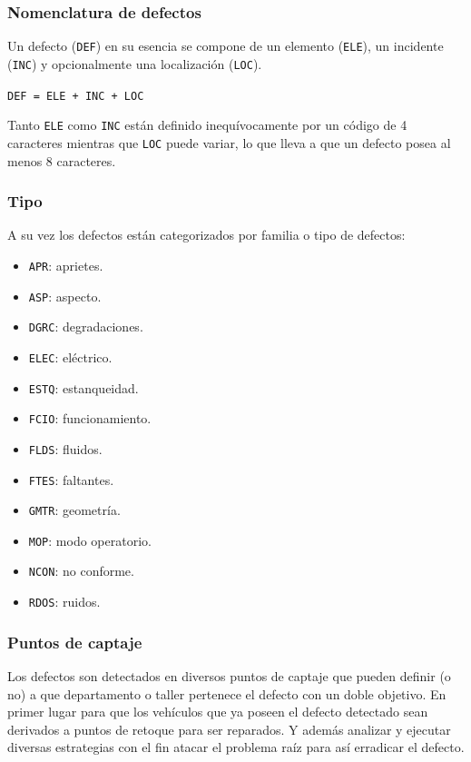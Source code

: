 \documentclass[a4paper,12pt]{article}
\begin{document}
\subsubsection{Nomenclatura de defectos}

Un defecto (\texttt{DEF}) en su esencia se compone de un elemento (\texttt{ELE}), un incidente (\texttt{INC}) y opcionalmente una localización (\texttt{LOC}).

\texttt{DEF = ELE + INC + LOC}

Tanto \texttt{ELE} como \texttt{INC} están definido inequívocamente por un código de 4 caracteres mientras que \texttt{LOC} puede variar, lo que lleva a que un defecto posea al menos 8 caracteres.

\subsubsection{Tipo}
A su vez los defectos están categorizados por familia o tipo de defectos:

\begin{itemize}
	\item \texttt{APR}: aprietes.
	\item \texttt{ASP}: aspecto.
	\item \texttt{DGRC}: degradaciones.
	\item \texttt{ELEC}: eléctrico.
	\item \texttt{ESTQ}: estanqueidad.
	\item \texttt{FCIO}: funcionamiento.
	\item \texttt{FLDS}: fluidos.
	\item \texttt{FTES}: faltantes.
	\item \texttt{GMTR}: geometría.
	\item \texttt{MOP}: modo operatorio.
	\item \texttt{NCON}: no conforme.
	\item \texttt{RDOS}: ruidos.
\end{itemize}

\subsubsection{Puntos de captaje} \label{ptocptj}
Los defectos son detectados en diversos puntos de captaje que pueden definir (o no) a que departamento o taller pertenece el defecto con un doble objetivo. En primer lugar para que los vehículos que ya poseen el defecto detectado sean derivados a puntos de retoque para ser reparados. Y además analizar y ejecutar diversas estrategias con el fin atacar el problema raíz para así erradicar el defecto.
\end{document}
